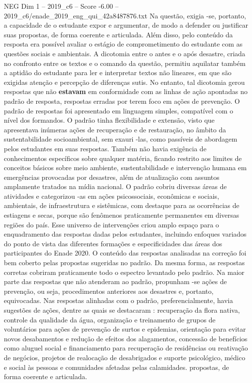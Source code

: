 \begin{textsample}{NEG Dim 1 – 2019\_c6 – Score -6.00 – 2019\_c6/enade\_2019\_eng\_qui\_42a8487876.txt}
Na questão, exigia -se, portanto, a capacidade de o estudante expor e argumentar, de modo a defender ou justificar suas propostas, de forma coerente e articulada.
Além disso, pelo conteúdo da resposta era possível avaliar o estágio de comprometimento do estudante com as questões sociais e ambientais.
A dicotomia entre o antes e o após desastre, criada no confronto entre os textos e o comando da questão, permitiu aquilatar também a aptidão do estudante para ler e interpretar textos não lineares, em que são exigidas atenção e percepção de diferenças sutis.
No entanto, tal dicotomia gerou respostas que não \textbf{estavam} em conformidade com as linhas de ação apontadas no padrão de resposta, respostas erradas por terem foco em ações de prevenção.
O padrão de respostas foi apresentado em linguagem simples, compatível com o nível dos formandos.
O padrão tinha flexibilidade e extensão, visto que apresentava inúmeras ações de recuperação e de restauração, no âmbito da sustentabilidade socioambiental, sem exauri -las, como passíveis de abordagem pelos estudantes em suas respostas.
Também não havia exigência de conhecimentos específicos sobre qualquer matéria, ficando restrito aos limites de conceitos básicos sobre meio ambiente, sustentabilidade e intervenção humana em emergências provocadas por desastres, além de atualização com assuntos amplamente tratados na mídia nacional.
O padrão cobriu diversas áreas de atividades e categorizou -as em ações psicossociais, econômicas e sociais, ambientais, de infraestrutura e sistêmicas, com destaque para as ocorrências de estiagens e secas, porque são fenômenos praticamente permanentes em diversas regiões do país.
Esse universo de intervenções criou amplo espaço para o enquadramento das respostas dadas pelos estudantes, incluindo enfoques variados do ponto de vista das diferentes formações e especificidades das áreas dos participantes do Enade 2020.
O conteúdo das respostas analisadas na correção foi bem coberto pelas propostas sugeridas no padrão.
Da mesma forma, as respostas corretas cobriram praticamente todo o espectro levantado pelo padrão.
Na maior parte das respostas que não atenderam ao padrão, propunham -se ações de prevenção, ou seja, procedimentos anteriores aos desastres e, portanto, equivocadas.
Nas respostas alinhadas com o padrão, preferencialmente, havia sugestões de ações, dentre as quais se destacaram : recuperação da flora nativa, controle da qualidade da água, organização e treinamento de grupos de voluntários para ações de prevenção de surtos e epidemias, orientação para evitar novos desabamentos e redução de efeitos dos alagamentos, concessão de benefícios como aluguel social e financiamento para recuperação de residências ou reativação de negócios, projetos de realocação de desabrigados e suporte psicológico, médico e social às pessoas e comunidades afetadas pelas calamidades. propostas, de forma coerente e articulada.

\end{textsample}
